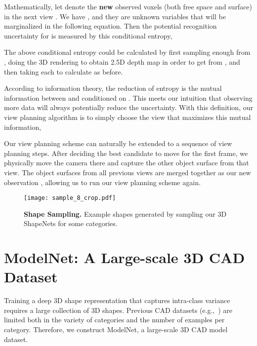 \documentclass[10pt,twocolumn,letterpaper]{article}
\begin{document}
Mathematically, 
let 
 denote the {\bf new} observed voxels 
(both free space and surface) in the next view .
We have , and they are unknown variables that will be marginalized in the following equation. 
Then the potential recognition uncertainty for  is measured by this conditional entropy,

The above conditional entropy could be calculated by first sampling enough  from ,
doing the 3D rendering to obtain 2.5D depth map in order to get  from , 
and then taking each  to calculate  as before. 




According to information theory, the reduction of entropy
 is the mutual information between  and  conditioned on . This meets our intuition that observing more data will always potentially reduce the uncertainty. 
With this definition, 
our view planning algorithm is to simply choose the view that maximizes this mutual information,
 

Our view planning scheme can naturally be extended to a sequence of view planning steps. After deciding the best candidate to move for the first frame, we physically move the camera there and capture the other object surface from that view. The object surfaces from all previous views are merged together as our new observation , allowing us to run our view planning scheme again.


\begin{figure}[t]
\vspace{-2mm}

\footnotesize
\centering
\texttt{[image: sample\_8\_crop.pdf]}

\vspace{-1mm}
\caption{{\bf Shape Sampling.} Example shapes generated by sampling our 3D ShapeNets for some categories.} 
\label{fig:samples}
\end{figure}




\section{ModelNet: A Large-scale 3D CAD Dataset}
Training a deep 3D shape representation that captures intra-class variance requires a large collection of 3D shapes. 
Previous CAD datasets (e.g.,~\cite{Psb}) are limited both in the variety of categories and the number of examples per category. 
Therefore, we construct ModelNet, a large-scale 3D CAD model dataset.
\end{document}
